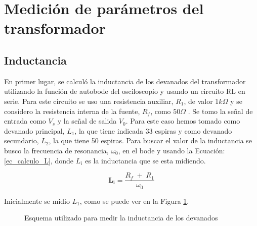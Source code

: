 \section{Medición de parámetros del transformador}
\subsection{Inductancia}
En primer lugar, se calculó la inductancia de los devanados del transformador utilizando la función de autobode del osciloscopio y usando un circuito RL en serie. Para este circuito se uso una resistencia auxiliar, $R_1$, de valor $1k\Omega$ y se considero la resistencia interna de la fuente, $R_f$, como $50\Omega$ . Se tomo la señal de entrada como $V_s$ y la señal de salida $V_0$. Para este caso hemos tomado como devanado principal, $L_1$, la que tiene indicada 33 espiras y como devanado secundario, $L_2$, la que tiene 50 espiras. Para buscar el valor de la inductancia se busco la frecuencia de resonancia, $\omega_0$, en el bode y usando la Ecuación: \ref{ec_calculo_L}, donde $L_i$ es la inductancia que se esta midiendo. 

\begin{equation}
\mathbf{L_i}=\frac{R_f\;+\;R_1}{\omega_0}
\label{ec_calculo_L}
\end{equation}


Inicialmente se midio $L_1$, como se puede ver en la Figura \ref{fig:medir_L1}.

\begin{figure}[H]
    
    \centering
    \caption{Esquema utilizado para medir la inductancia de los devanados}
    \label{fig:medir_L1}
\end{figure}
 

